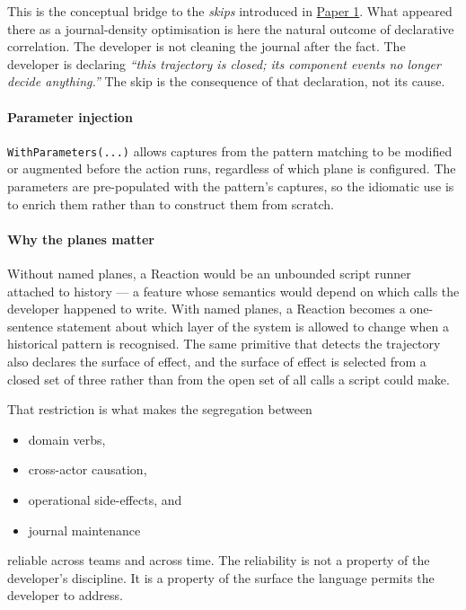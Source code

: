 \documentclass[
]{article}
\providecommand{\tightlist}{%
  \setlength{\itemsep}{0pt}\setlength{\parskip}{0pt}}
\let\origtexttt\texttt%
\renewcommand{\texttt}[1]{\origtexttt{\seqsplit{#1}}}%
\let\texttt\origtexttt%
\begin{document}
This is the conceptual bridge to the \emph{skips} introduced in
\href{01-anti-porosity.md}{Paper 1}. What appeared there as a
journal-density optimisation is here the natural outcome of declarative
correlation. The developer is not cleaning the journal after the fact.
The developer is declaring \emph{``this trajectory is closed; its
component events no longer decide anything.''} The skip is the
consequence of that declaration, not its cause.

\paragraph{Parameter injection}\label{parameter-injection}

\texttt{WithParameters(...)} allows captures from the pattern matching
to be modified or augmented before the action runs, regardless of which
plane is configured. The parameters are pre-populated with the pattern's
captures, so the idiomatic use is to enrich them rather than to
construct them from scratch.

\paragraph{Why the planes matter}\label{why-the-planes-matter}

Without named planes, a Reaction would be an unbounded script runner
attached to history --- a feature whose semantics would depend on which
calls the developer happened to write. With named planes, a Reaction
becomes a one-sentence statement about which layer of the system is
allowed to change when a historical pattern is recognised. The same
primitive that detects the trajectory also declares the surface of
effect, and the surface of effect is selected from a closed set of three
rather than from the open set of all calls a script could make.

That restriction is what makes the segregation between

\begin{itemize}
\tightlist
\item
  domain verbs,
\item
  cross-actor causation,
\item
  operational side-effects, and
\item
  journal maintenance
\end{itemize}

reliable across teams and across time. The reliability is not a property
of the developer's discipline. It is a property of the surface the
language permits the developer to address.
\end{document}

